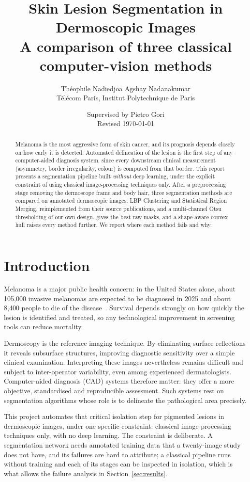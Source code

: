\documentclass[11pt,a4paper]{article}
\title{\textbf{Skin Lesion Segmentation in Dermoscopic Images}\\[0.3em]
\large A comparison of three classical computer-vision methods}
\author{Théophile Nadiedjoa \qquad Agshay Nadanakumar\\[0.3em]
\normalsize Télécom Paris, Institut Polytechnique de Paris}
\date{Supervised by Pietro Gori\\[0.5em]
Revised \today}
\begin{document}
\maketitle

\begin{abstract}
\noindent
Melanoma is the most aggressive form of skin cancer, and its prognosis depends
closely on how early it is detected. Automated delineation of the lesion is the
first step of any computer-aided diagnosis system, since every downstream
clinical measurement (asymmetry, border irregularity, colour) is computed
from that border. This report presents a segmentation pipeline built
\emph{without} deep learning, under the explicit constraint of using classical
image-processing techniques only. After a preprocessing stage removing the
dermoscope frame and body hair, three segmentation methods are compared on
\nimages{} annotated dermoscopic images: LBP Clustering and Statistical Region
Merging, reimplemented from their source publications, and a multi-channel Otsu
thresholding of our own design. \bestmethod{} gives the best raw masks, and a shape-aware convex hull
raises every method further. We report where each method fails and why.
\end{abstract}

\section{Introduction}

Melanoma is a major public health concern: in the United States alone, about
105{,}000 invasive melanomas are expected to be diagnosed in 2025 and about
8{,}400 people to die of the disease~\cite{siegel2025}. Survival
depends strongly on how quickly the lesion is identified and treated, so any
technological improvement in screening tools can reduce mortality.

Dermoscopy is the reference imaging technique. By eliminating surface
reflections it reveals subsurface structures, improving diagnostic sensitivity
over a simple clinical examination. Interpreting these images nevertheless
remains difficult and subject to inter-operator variability, even among
experienced dermatologists. Computer-aided diagnosis (CAD) systems therefore
matter: they offer a more objective, standardised and reproducible assessment.
Such systems rest on segmentation algorithms whose role is to delineate the
pathological area precisely.

This project automates that critical isolation step for pigmented lesions in
dermoscopic images, under one specific constraint: classical image-processing
techniques only, with no deep learning. The constraint is deliberate. A
segmentation network needs annotated training data that a twenty-image study
does not have, and its failures are hard to attribute; a classical pipeline runs
without training and each of its stages can be inspected in isolation, which is
what allows the failure analysis in Section~\ref{sec:results}.
\end{document}
